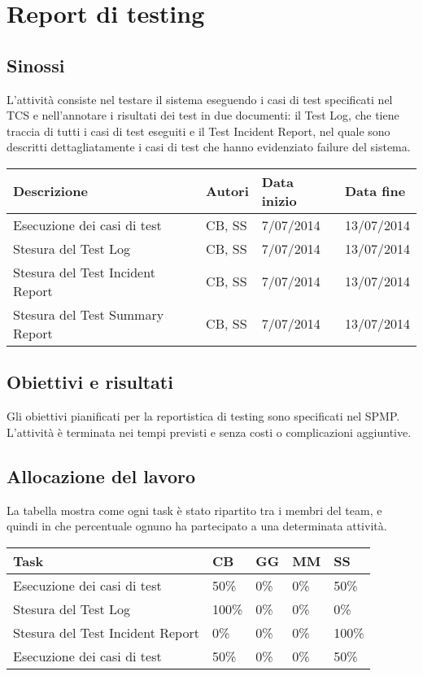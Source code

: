 \section{Report di testing}
\subsection{Sinossi}
L'attività consiste nel testare il sistema eseguendo i casi di test specificati nel TCS e nell'annotare i risultati dei test in due documenti: il Test Log, che tiene traccia di tutti i casi di test eseguiti e il Test Incident Report, nel quale sono descritti dettagliatamente i casi di test che hanno evidenziato failure del sistema.

\begin{table}[ht]
 \begin{tabular}{|p{6cm}|p{2cm}|p{2cm}|p{2cm}|}
    \hline
    \rowcolor{Gray}\textbf{Descrizione}			& \textbf{Autori}		& \textbf{Data inizio}			& \textbf{Data fine}	\\
    \hline
    Esecuzione dei casi di test				& CB, SS			& 7/07/2014				& 13/07/2014		\\
    \hline
    Stesura del Test Log				& CB, SS			& 7/07/2014				& 13/07/2014		\\
    \hline
    Stesura del Test Incident Report			& CB, SS			& 7/07/2014				& 13/07/2014		\\
    \hline
    Stesura del Test Summary Report			& CB, SS			& 7/07/2014				& 13/07/2014		\\
    \hline
 \end{tabular}
\end{table}

\subsection{Obiettivi e risultati}
Gli obiettivi pianificati per la reportistica di testing sono specificati nel SPMP. L'attività è terminata nei tempi previsti e senza costi o complicazioni aggiuntive.

\subsection{Allocazione del lavoro}
La tabella mostra come ogni task è stato ripartito tra i membri del team, e quindi in che percentuale ognuno ha partecipato a una determinata attività.
\begin{table}[ht]
 \centering
 \begin{tabular}{|p{7.5cm}|p{1cm}|p{1cm}|p{1cm}|p{1cm}|}
  \hline
  \rowcolor{Gray}\textbf{Task}			& \textbf{CB}		& \textbf{GG}		& \textbf{MM}		& \textbf{SS}		\\
  \hline
  Esecuzione dei casi di test			& 50\%			& 0\%			& 0\%			& 50\%			\\
  \hline
  Stesura del Test Log				& 100\%			& 0\%			& 0\%			& 0\%			\\
  \hline
  Stesura del Test Incident Report		& 0\%			& 0\%			& 0\%			& 100\%			\\
  \hline
  Esecuzione dei casi di test			& 50\%			& 0\%			& 0\%			& 50\%			\\
  \hline
 \end{tabular}
\end{table}
